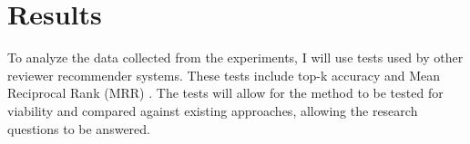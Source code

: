 \documentclass[conference]{ieee/IEEEtran}
\begin{document}
\section{Results}
To analyze the data collected from the experiments, I will use tests used by other reviewer recommender systems.
These tests include top-k accuracy and  Mean Reciprocal Rank (MRR) \cite{thongtanunam15,kovalenko18}.
The tests will allow for the method to be tested for viability and compared against existing approaches, allowing the research questions to be answered.

\printbibliography
\end{document}
